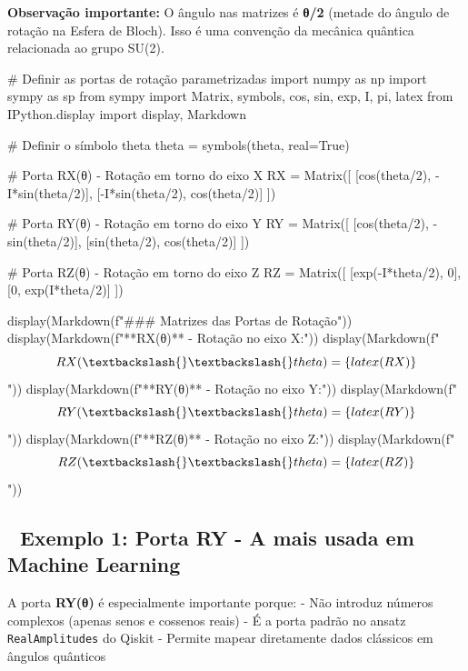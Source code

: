 \documentclass[
  brazilian,
]{report}
\newenvironment{Shaded}{\begin{snugshade}}{\end{snugshade}}
\newcommand{\NormalTok}[1]{\textcolor[rgb]{0.00,0.23,0.31}{#1}}
\begin{document}
\textbf{Observação importante:} O ângulo nas matrizes é \textbf{θ/2}
(metade do ângulo de rotação na Esfera de Bloch). Isso é uma convenção
da mecânica quântica relacionada ao grupo SU(2).

\begin{Shaded}
\begin{Highlighting}[]

\NormalTok{\# Definir as portas de rotação parametrizadas}
\NormalTok{import numpy as np}
\NormalTok{import sympy as sp}
\NormalTok{from sympy import Matrix, symbols, cos, sin, exp, I, pi, latex}
\NormalTok{from IPython.display import display, Markdown}

\NormalTok{\# Definir o símbolo theta}
\NormalTok{theta = symbols(\textquotesingle{}theta\textquotesingle{}, real=True)}

\NormalTok{\# Porta RX(θ) {-} Rotação em torno do eixo X}
\NormalTok{RX = Matrix([}
\NormalTok{    [cos(theta/2), {-}I*sin(theta/2)],}
\NormalTok{    [{-}I*sin(theta/2), cos(theta/2)]}
\NormalTok{])}

\NormalTok{\# Porta RY(θ) {-} Rotação em torno do eixo Y  }
\NormalTok{RY = Matrix([}
\NormalTok{    [cos(theta/2), {-}sin(theta/2)],}
\NormalTok{    [sin(theta/2), cos(theta/2)]}
\NormalTok{])}

\NormalTok{\# Porta RZ(θ) {-} Rotação em torno do eixo Z}
\NormalTok{RZ = Matrix([}
\NormalTok{    [exp({-}I*theta/2), 0],}
\NormalTok{    [0, exp(I*theta/2)]}
\NormalTok{])}

\NormalTok{display(Markdown(f"\#\#\# Matrizes das Portas de Rotação"))}
\NormalTok{display(Markdown(f"**RX(θ)** {-} Rotação no eixo X:"))}
\NormalTok{display(Markdown(f"$$ RX(\textbackslash{}\textbackslash{}theta) = \{latex(RX)\} $$"))}
\NormalTok{display(Markdown(f"**RY(θ)** {-} Rotação no eixo Y:"))}
\NormalTok{display(Markdown(f"$$ RY(\textbackslash{}\textbackslash{}theta) = \{latex(RY)\} $$"))}
\NormalTok{display(Markdown(f"**RZ(θ)** {-} Rotação no eixo Z:"))}
\NormalTok{display(Markdown(f"$$ RZ(\textbackslash{}\textbackslash{}theta) = \{latex(RZ)\} $$"))}
\end{Highlighting}
\end{Shaded}

\subsection{🔬 Exemplo 1: Porta RY - A mais usada em Machine
Learning}\label{exemplo-1-porta-ry---a-mais-usada-em-machine-learning}

A porta \textbf{RY(θ)} é especialmente importante porque: - Não introduz
números complexos (apenas senos e cossenos reais) - É a porta padrão no
ansatz \texttt{RealAmplitudes} do Qiskit - Permite mapear diretamente
dados clássicos em ângulos quânticos
\end{document}
